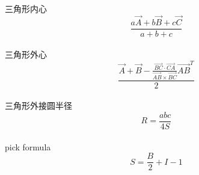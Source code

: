 	三角形内心\\ \[\frac{a\vec {A} + b\vec{B} + c\vec{C}}{a + b + c} \] \\
	三角形外心\\ \[\frac{\vec{A} + \vec{B} - \frac{\overrightarrow {BC} \cdot \overrightarrow{CA}}{\overrightarrow {AB} \times \overrightarrow{BC}}\overrightarrow {AB}^T}{2}\] \\
	三角形外接圆半径\\
	\[R = \frac{abc}{4S}\]\\
	pick formula\\
	\[S = \frac{B}{2} + I - 1\]
